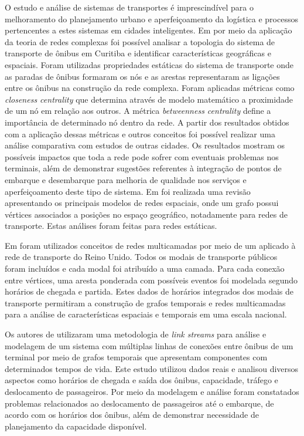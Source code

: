 O estudo e análise de sistemas de transportes é imprescindível para o melhoramento do planejamento urbano e aperfeiçoamento da logística e processos pertencentes a estes sistemas em cidades inteligentes.
Em \cite{bon:16} por meio da aplicação da teoria de redes complexas foi possível analisar a topologia do sistema de transporte de ônibus em Curitiba e identificar características geográficas e espaciais. Foram utilizadas propriedades estáticas do sistema de transporte onde as paradas de ônibus formaram os nós e as arestas representaram as ligações entre os ônibus na construção da rede complexa. Foram aplicadas métricas como \emph{closeness centrality} que determina através de modelo matemático a proximidade de um nó em relação aos outros. A métrica \emph{betweenness centrality} define a importância de determinado nó dentro da rede. A partir dos resultados obtidos com a aplicação dessas métricas e outros conceitos foi possível realizar uma análise comparativa com estudos de outras cidades. Os resultados mostram os possíveis impactos que toda a rede pode sofrer com eventuais problemas nos terminais, além de demonstrar sugestões referentes à integração de pontos de embarque e desembarque para melhoria de qualidade nos serviços e aperfeiçoamento deste tipo de sistema. Em \cite{bart:15} foi realizada uma revisão apresentando os principais modelos de redes espaciais, onde um grafo possui vértices associados a posições no espaço geográfico, notadamente para redes de transporte. Estas análises foram feitas para redes estáticas.

Em \cite{gal:15} foram utilizados conceitos de redes multicamadas por meio de um  aplicado à rede de transporte do Reino Unido. Todos os modais de transporte públicos foram incluídos e cada modal foi atribuído a uma camada. Para cada conexão entre vértices, uma aresta ponderada com possíveis eventos foi modelada segundo horários de chegada e partida. Estes dados de horários integrados dos modais de transporte permitiram a construção de grafos temporais e redes multicamadas para a análise de características espaciais e temporais em uma escala nacional.

Os autores de \cite{curz:19} utilizaram uma metodologia de \emph{link streams} para análise e modelagem de um sistema com múltiplas linhas de conexões entre ônibus de um terminal por meio de grafos temporais que apresentam componentes com determinados tempos de vida. Este estudo utilizou dados reais e analisou diversos aspectos como horários de chegada e saída dos ônibus, capacidade, tráfego e deslocamento de passageiros. Por meio da modelagem e análise foram constatados problemas relacionados ao deslocamento de passageiros até o embarque, de acordo com os horários dos ônibus, além de demonstrar necessidade de planejamento da capacidade disponível.

